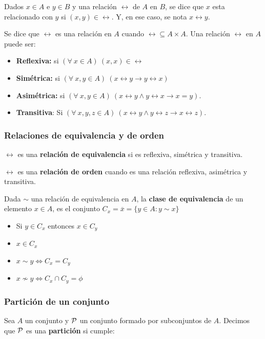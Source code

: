     Dados $x\in A$ e $y\in B$ y una relación $\rel$ de $A$ en $B$, se dice que $x$ esta relacionado con $y$ si $(x,y)\in\rel$. Y, en ese caso, se nota $x\rel y$.
    
    Se dice que $\rel$ es una relación en $A$ cuando $\rel\subseteq A\times A$. Una relación $\rel$ en $A$ puede ser:
    
    \begin{itemize}
        \item \textbf{Reflexiva:} si $(\forall~ x\in A)~(x,x)\in\rel $
        \item \textbf{Simétrica:} si $(\forall~ x,y\in A)~(x\rel y \to y\rel x)$
        \item \textbf{Asimétrica:} si $(\forall~ x,y\in A)~(x\rel y \land y\rel x \to x = y)$.
        \item \textbf{Transitiva}: Si $(\forall~ x,y,z\in A)~(x\rel y \land y\rel z \to x\rel z)$.
    \end{itemize}
    
\subsubsection{Relaciones de equivalencia y de orden}
    $\rel$ es una \textbf{relación de equivalencia} si es reflexiva, simétrica y transitiva.
    
    $\rel$ es una \textbf{relación de orden} cuando es una relación reflexiva, asimétrica y transitiva.
        
    Dada $\sim$ una relación de equivalencia en $A$, la \textbf{clase de equivalencia} de un elemento $x\in A$, es el conjunto $C_x = \overline{x} = \{y\in A: y\sim x\}$
        
    \begin{itemize}
        \item Si $y\in C_x$ entonces $x\in C_y$
        \item $x\in C_x$
        \item $x\sim y \iff C_x = C_y$
        \item $x\not\sim y \iff C_x \cap C_y = \phi$
    \end{itemize}    
    
\subsubsection{Partición de un conjunto}
    Sea $A$ un conjunto y $\mathcal{P}$ un conjunto formado por subconjuntos de $A$. Decimos que $\mathcal{P}$ es una \textbf{partición} si cumple:
    
